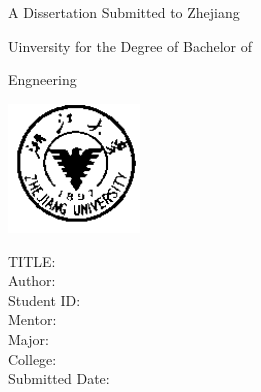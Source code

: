 \thispagestyle{empty}

{
\setlength{\parindent}{0em}
\renewcommand{\baselinestretch}{2}

\vspace*{6mm}

{
\renewcommand{\baselinestretch}{1}
\songti\erhao
A Dissertation Submitted to Zhejiang \par

Uinversity for the Degree of Bachelor of \par

Engneering \par
}

\vspace{1.5em}

\begin{center}
  \includegraphics[width=35mm]{data/cover/xiaobiao}
\end{center}

\vspace{2em}

{
\renewcommand{\baselinestretch}{2.5}
\songti\erhao
\centering
\hspace*{-0.5em}TITLE: \; \underline{\makebox[16em]{\zjutitlee}}\hspace*{-0.5em} \\
\vspace{2em}
\sihao
Author: \; \underline{\makebox[22em]{\zjuauthornamee}} \\
Student ID: \; \underline{\makebox[22em]{\zjuauthorid}} \\
Mentor: \; \underline{\makebox[22em]{\zjumentore}} \\
Major: \; \underline{\makebox[19em]{\zjumajore}} \\
College: \; \underline{\makebox[20em]{\zjucollegee}} \\
Submitted Date: \; \underline{\makebox[20em]{\zjudatee}} \par
}
}
